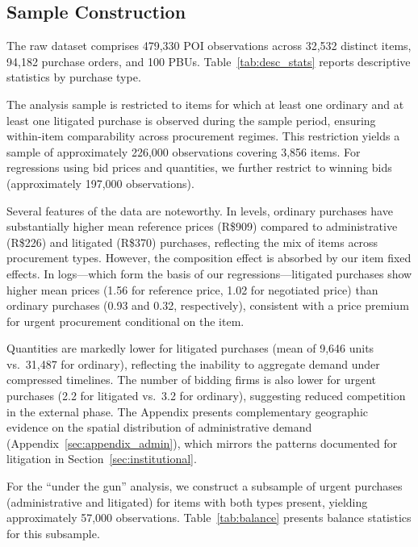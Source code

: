 \subsection{Sample Construction}

The raw dataset comprises 479,330 POI observations across 32,532 distinct items, 94,182 purchase orders, and 100 PBUs. Table~\ref{tab:desc_stats} reports descriptive statistics by purchase type.



The analysis sample is restricted to items for which at least one ordinary and at least one litigated purchase is observed during the sample period, ensuring within-item comparability across procurement regimes. This restriction yields a sample of approximately 226,000 observations covering 3,856 items. For regressions using bid prices and quantities, we further restrict to winning bids (approximately 197,000 observations).

Several features of the data are noteworthy. In levels, ordinary purchases have substantially higher mean reference prices (R\$909) compared to administrative (R\$226) and litigated (R\$370) purchases, reflecting the mix of items across procurement types. However, the composition effect is absorbed by our item fixed effects. In logs---which form the basis of our regressions---litigated purchases show higher mean prices (1.56 for reference price, 1.02 for negotiated price) than ordinary purchases (0.93 and 0.32, respectively), consistent with a price premium for urgent procurement conditional on the item.

Quantities are markedly lower for litigated purchases (mean of 9,646 units vs.\ 31,487 for ordinary), reflecting the inability to aggregate demand under compressed timelines. The number of bidding firms is also lower for urgent purchases (2.2 for litigated vs.\ 3.2 for ordinary), suggesting reduced competition in the external phase. The Appendix presents complementary geographic evidence on the spatial distribution of administrative demand (Appendix~\ref{sec:appendix_admin}), which mirrors the patterns documented for litigation in Section~\ref{sec:institutional}.

For the ``under the gun'' analysis, we construct a subsample of urgent purchases (administrative and litigated) for items with both types present, yielding approximately 57,000 observations. Table~\ref{tab:balance} presents balance statistics for this subsample.



